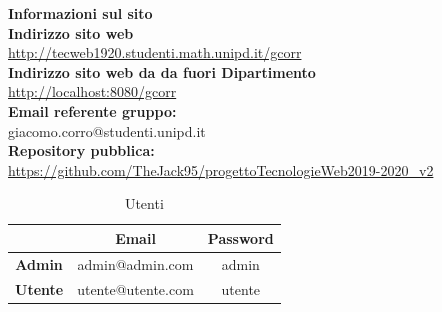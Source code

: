 \begin{center}
	\textbf{\Large{Informazioni sul sito}}\\
	\textbf{Indirizzo sito web} \\ \url{http://tecweb1920.studenti.math.unipd.it/gcorr}\\
	\textbf{Indirizzo sito web da da fuori Dipartimento} \\ \url{http://localhost:8080/gcorr}\\
	\textbf{Email referente gruppo:} \\ giacomo.corro@studenti.unipd.it \\
	\textbf{Repository pubblica:} \\ \url{https://github.com/TheJack95/progettoTecnologieWeb2019-2020_v2}\\
	\renewcommand{\arraystretch}{1.8}
	\begin{longtable}[H]{c c c}
		\caption{Utenti}\\
		\rowcolor[HTML]{F1AB00}
		\multicolumn{1}{c}{\color[HTML]{FFFFFF} \textbf{Utente}} &
		\multicolumn{1}{c}{\color[HTML]{FFFFFF} \textbf{Email}} &
		\multicolumn{1}{c}{\color[HTML]{FFFFFF} \textbf{Password}} \\
		\endhead
		\textbf{Admin} & admin@admin.com & admin\\
		\textbf{Utente} & utente@utente.com & utente\\
	\end{longtable}
\end{center}
